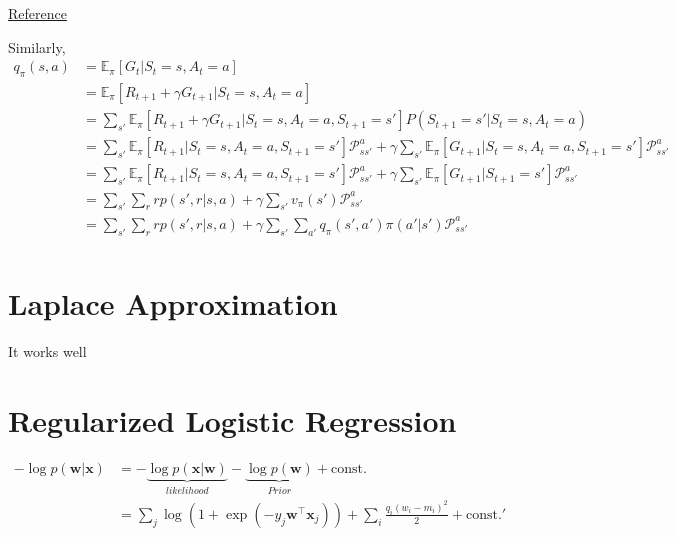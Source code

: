 \begin{appendices}
\href{https://stats.stackexchange.com/questions/243384/deriving-bellmans-equation-in-reinforcement-learning}{Reference}

Similarly,
\begin{align*}
	q_\pi(s, a) &= \mathbb{E}_{\pi}[G_t|S_t = s, A_t=a]\\ 
	&= \mathbb{E}_{\pi}[R_{t+1}+\gamma G_{t+1}|S_t = s, A_t=a]\\ 
	&= \sum_{s'}\mathbb{E}_{\pi}[R_{t+1}+\gamma G_{t+1}|S_t = s, A_t=a, S_{t+1}=s'] P(S_{t+1}=s'|S_t=s, A_t=a)\\ 
	&= \sum_{s'}\mathbb{E}_{\pi}[R_{t+1}|S_t = s, A_t=a, S_{t+1}=s'] \mathcal{P}_{ss'}^a + \gamma\sum_{s'}\mathbb{E}_{\pi}[G_{t+1}|S_t = s, A_t=a, S_{t+1}=s'] \mathcal{P}_{ss'}^a \\ 
	&= \sum_{s'}\mathbb{E}_{\pi}[R_{t+1}|S_t = s, A_t=a, S_{t+1}=s'] \mathcal{P}_{ss'}^a + \gamma\sum_{s'}\mathbb{E}_{\pi}[G_{t+1}|S_{t+1}=s'] \mathcal{P}_{ss'}^a \\ 
	&= \sum_{s'} \sum_r r p(s',r|s,a) + \gamma\sum_{s'}v_\pi(s') \mathcal{P}_{ss'}^a \\ 
	&= \sum_{s'}\sum_r r p(s',r|s,a) + \gamma\sum_{s'}\sum_{a'}q_\pi(s',a')\pi(a'|s') \mathcal{P}_{ss'}^a \\ 
\end{align*}

\section{Laplace Approximation}
It works well

\section{Regularized Logistic Regression}

\begin{align*}
	-\log p(\boldsymbol{w}|\boldsymbol{x}) &= -\underbrace{\log p(\boldsymbol{x}|\boldsymbol{w})}_{likelihood} - \underbrace{\log p(\boldsymbol{w})}_{Prior} + \text{const.} \\
	&= \sum\limits_j \log \left( 1 + \exp(-y_j \boldsymbol{w}^\top \boldsymbol{x}_j) \right) + \sum\limits_i \frac{q_i (w_i - m_i)^2}{2} + \text{const.}'
\end{align*}

\end{appendices}
